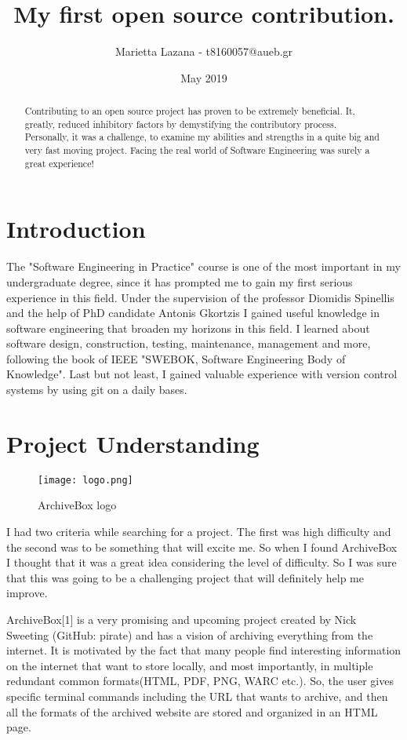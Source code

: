 \documentclass{article}
\title{My first open source contribution.}
\author{Marietta Lazana - t8160057@aueb.gr}
\date{May 2019}
\begin{document}
\maketitle

\begin{abstract}
Contributing to an open source project has proven to be extremely beneficial. It, greatly, reduced inhibitory factors by demystifying the contributory process. Personally, it was a challenge, to examine my abilities and strengths in a quite big and very fast moving project. Facing the real world of Software Engineering was surely a great experience!
  
\end{abstract}

\section*{Introduction}
The "Software Engineering in Practice" course is one of the most important in my undergraduate degree, since it has prompted me to gain my first serious experience in this field. Under the supervision of the professor Diomidis Spinellis and the help of PhD candidate Antonis Gkortzis I gained useful knowledge in software engineering that broaden my horizons in this field. I learned about software design, construction, testing, maintenance, management and more, following the book of IEEE "SWEBOK, Software Engineering  Body of Knowledge". Last but not least, I gained valuable experience with version control systems by using git on a daily bases.

\section{Project Understanding}

\begin{figure}[tph!]
\centerline{\texttt{[image: logo.png]}}
    \caption{ArchiveBox logo}
    \label{fig:verticalcell}
\end{figure}

I had two criteria while searching for a project. The first was high difficulty and the second was to be something that will excite me. So when I found ArchiveBox I thought that it was a great idea considering the level of difficulty. So I was sure that this was going to be a challenging project that will definitely help me improve.

ArchiveBox[1] is a very promising and upcoming project created by Nick Sweeting (GitHub: pirate) and has a vision of archiving everything from the internet. It is motivated by the fact that many people find interesting information on the internet that want to store locally, and most importantly, in multiple redundant common formats(HTML, PDF, PNG, WARC etc.). So, the user gives specific terminal commands including the URL that wants to archive, and then all the formats of the archived website are stored and organized in an HTML page.
\end{document}
